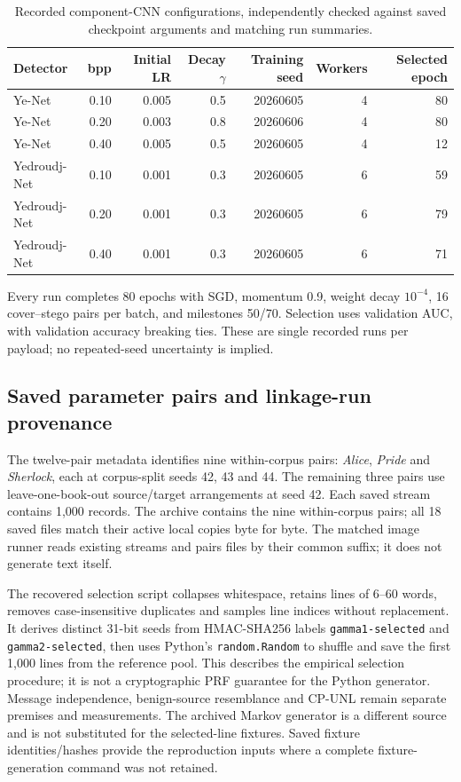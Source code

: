 \documentclass[journal]{IEEEtran}
\renewcommand{\arraystretch}{1.2}
\renewcommand{\arraystretch}{1.0}
\theoremstyle{definition}
\theoremstyle{game}
\renewcommand{\arraystretch}{1.5}
\begin{document}
\begin{table}[!t]
\centering\footnotesize
\caption{Recorded component-CNN configurations, independently checked against saved checkpoint arguments and matching run summaries.}
\label{tab:recorded-cnn-config}
\setlength{\tabcolsep}{5pt}\renewcommand{\arraystretch}{1.15}
\begin{tabular}{lrrrrrr}
\toprule
Detector & bpp & Initial LR & Decay $\gamma$ & Training seed & Workers & Selected epoch\\
\midrule
Ye-Net & 0.10 & 0.005 & 0.5 & 20260605 & 4 & 80\\
Ye-Net & 0.20 & 0.003 & 0.8 & 20260606 & 4 & 80\\
Ye-Net & 0.40 & 0.005 & 0.5 & 20260605 & 4 & 12\\
Yedroudj-Net & 0.10 & 0.001 & 0.3 & 20260605 & 6 & 59\\
Yedroudj-Net & 0.20 & 0.001 & 0.3 & 20260605 & 6 & 79\\
Yedroudj-Net & 0.40 & 0.001 & 0.3 & 20260605 & 6 & 71\\
\bottomrule
\end{tabular}
\par\smallskip\parbox{.97\textwidth}{\footnotesize Every run completes 80 epochs with SGD, momentum 0.9, weight decay $10^{-4}$, 16 cover--stego pairs per batch, and milestones 50/70. Selection uses validation AUC, with validation accuracy breaking ties. These are single recorded runs per payload; no repeated-seed uncertainty is implied.}
\end{table}

\subsection{Saved parameter pairs and linkage-run provenance}
\label{subsec:repro-pairs}
The twelve-pair metadata identifies nine within-corpus pairs:
\emph{Alice}, \emph{Pride} and \emph{Sherlock}, each at corpus-split
seeds 42, 43 and 44. The remaining three pairs use leave-one-book-out
source/target arrangements at seed 42. Each saved stream contains 1,000
records. The archive contains the nine within-corpus pairs; all 18 saved
files match their active local copies byte for byte. The matched image
runner reads existing streams and pairs files by their common suffix;
it does not generate text itself.

The recovered selection script collapses whitespace, retains lines of
6--60 words, removes case-insensitive duplicates and samples line indices
without replacement. It derives distinct 31-bit seeds from HMAC-SHA256
labels \texttt{gamma1-selected} and \texttt{gamma2-selected}, then uses
Python's \texttt{random.Random} to shuffle and save the first 1,000
lines from the reference pool. This describes the empirical selection
procedure; it is not a cryptographic PRF guarantee for the Python
generator. Message independence, benign-source resemblance and CP-UNL
remain separate premises and measurements. The archived Markov generator
is a different source and is not substituted for the selected-line
fixtures. Saved fixture identities/hashes provide the reproduction inputs
where a complete fixture-generation command was not retained.
\end{document}

